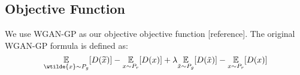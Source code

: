\subsection{Objective Function}
We use WGAN-GP as our objective objective function [reference]. The original WGAN-GP formula is defined as:
\begin{equation}
\underset{\wtilde{x} \sim P_g}{\mathbb{E}}[D(\widetilde{x})] - \underset{x \sim P_r}{\mathbb{E}}[D(x)] + \lambda \underset{\tilde{x} \sim P_g}{\mathbb{E}}[D(\tilde{x})] - \underset{x \sim P_r}{\mathbb{E}}[D(x)]
\end{equation}